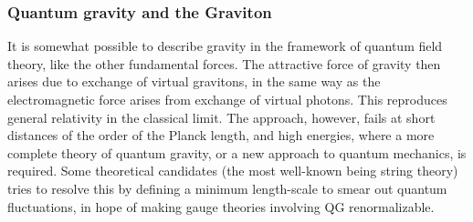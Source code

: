 \subsubsection{Quantum gravity and the Graviton}
It is somewhat possible to describe gravity in the framework of quantum field theory, like the other fundamental forces. The attractive force of gravity then arises due to exchange of virtual gravitons, in the same way as the electromagnetic force arises from exchange of virtual photons. This reproduces general relativity in the classical limit. The approach, however, fails at short distances of the order of the Planck length, and high energies, where a more complete theory of quantum gravity, or a new approach to quantum mechanics, is required. Some theoretical candidates (the most well-known being string theory) tries to resolve this by defining a minimum length-scale to smear out quantum fluctuations, in hope of making gauge theories involving QG renormalizable.
